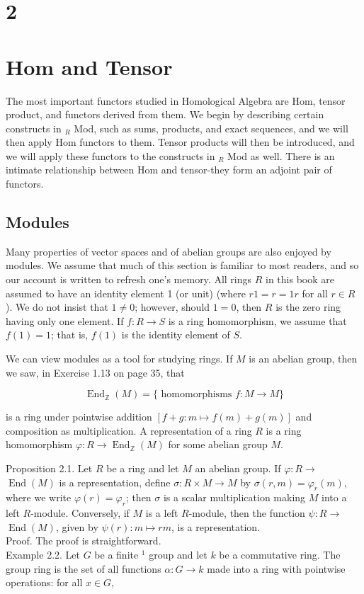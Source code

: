 \documentclass[10pt]{article}
\begin{document}
\section*{2}
\section*{Hom and Tensor}
The most important functors studied in Homological Algebra are Hom, tensor product, and functors derived from them. We begin by describing certain constructs in ${ }_{R}$ Mod, such as sums, products, and exact sequences, and we will then apply Hom functors to them. Tensor products will then be introduced, and we will apply these functors to the constructs in ${ }_{R}$ Mod as well. There is an intimate relationship between Hom and tensor-they form an adjoint pair of functors.

\subsection*{Modules}
Many properties of vector spaces and of abelian groups are also enjoyed by modules. We assume that much of this section is familiar to most readers, and so our account is written to refresh one's memory. All rings $R$ in this book are assumed to have an identity element 1 (or unit) (where $r 1=r=1 r$ for all $r \in R$ ). We do not insist that $1 \neq 0$; however, should $1=0$, then $R$ is the zero ring having only one element. If $f: R \rightarrow S$ is a ring homomorphism, we assume that $f(1)=1$; that is, $f(1)$ is the identity element of $S$.

We can view modules as a tool for studying rings. If $M$ is an abelian group, then we saw, in Exercise 1.13 on page 35, that

$$
\operatorname{End}_{\mathbb{Z}}(M)=\{\text { homomorphisms } f: M \rightarrow M\}
$$

is a ring under pointwise addition $[f+g: m \mapsto f(m)+g(m)]$ and composition as multiplication. A representation of a ring $R$ is a ring homomorphism $\varphi: R \rightarrow \operatorname{End}_{\mathbb{Z}}(M)$ for some abelian group $M$.

Proposition 2.1. Let $R$ be a ring and let $M$ an abelian group. If $\varphi: R \rightarrow$ $\operatorname{End}(M)$ is a representation, define $\sigma: R \times M \rightarrow M$ by $\sigma(r, m)=\varphi_{r}(m)$, where we write $\varphi(r)=\varphi_{r}$; then $\sigma$ is a scalar multiplication making $M$ into a left $R$-module. Conversely, if $M$ is a left $R$-module, then the function $\psi: R \rightarrow$ $\operatorname{End}(M)$, given by $\psi(r): m \mapsto r m$, is a representation.\\
Proof. The proof is straightforward.\\
Example 2.2. Let $G$ be a finite ${ }^{1}$ group and let $k$ be a commutative ring. The group ring is the set of all functions $\alpha: G \rightarrow k$ made into a ring with pointwise operations: for all $x \in G$,
\end{document}
